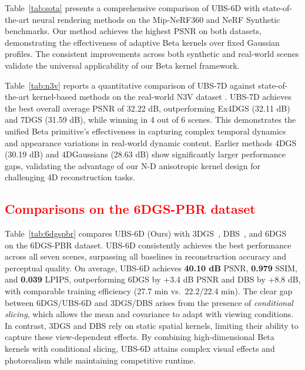 \documentclass{article} %
\begin{document}
Table~\ref{tab:sota} presents a comprehensive comparison of UBS-6D with state-of-the-art neural rendering methods on the Mip-NeRF360 \citep{barron2021mipnerf} and NeRF Synthetic \citep{mildenhall2021nerf} benchmarks. Our method achieves the highest PSNR on both datasets, demonstrating the effectiveness of adaptive Beta kernels over fixed Gaussian profiles. 
The consistent improvements across both synthetic and real-world scenes validate the universal applicability of our Beta kernel framework.



Table~\ref{tab:n3v} reports a quantitative comparison of UBS-7D against state-of-the-art kernel-based methods on the real-world N3V dataset \citep{li2022neural}. UBS-7D achieves the best overall average PSNR of 32.22 dB, outperforming Ex4DGS (32.11 dB) and 7DGS (31.59 dB), while winning in 4 out of 6 scenes. This demonstrates the unified Beta primitive's effectiveness in capturing complex temporal dynamics and appearance variations in real-world dynamic content. Earlier methods 4DGS (30.19 dB) and 4DGaussians (28.63 dB) show significantly larger performance gaps, validating the advantage of our N-D anisotropic kernel design for challenging 4D reconstruction tasks.




\subsection{\textcolor{red}{Comparisons on the 6DGS-PBR dataset}}

Table~\ref{tab:6dgspbr} compares UBS-6D (Ours) with 3DGS~\citep{3dgs}, DBS~\citep{liu2025deformable}, and 6DGS~\citep{gao20246dgs} on the 6DGS-PBR dataset. UBS-6D consistently achieves the best performance across all seven scenes, surpassing all baselines in reconstruction accuracy and perceptual quality.
On average, UBS-6D achieves \textbf{40.10 dB} PSNR, \textbf{0.979} SSIM, and \textbf{0.039} LPIPS, outperforming 6DGS by +3.4 dB PSNR and DBS by +8.8 dB, with comparable training efficiency (27.7 min vs.\ 22.2/22.4 min). The clear gap between 6DGS/UBS-6D and 3DGS/DBS arises from the presence of \textit{conditional slicing}, which allows the mean and covariance to adapt with viewing conditions. In contrast, 3DGS and DBS rely on static spatial kernels, limiting their ability to capture these view-dependent effects. By combining high-dimensional Beta kernels with conditional slicing, UBS-6D attains complex visual effects and photorealism while maintaining competitive runtime.
\end{document}
